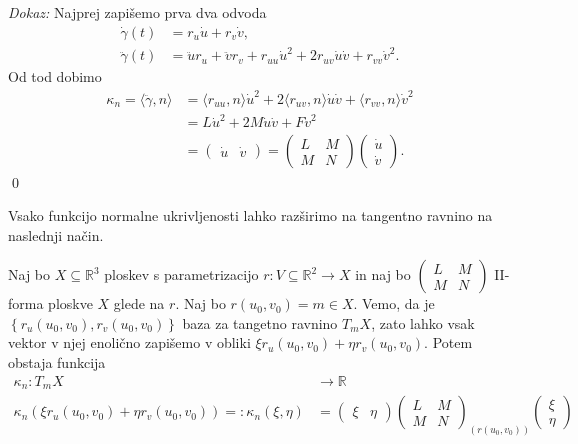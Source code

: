\noident
{\em Dokaz:\/}
 Najprej zapišemo prva dva odvoda 
 \begin{align*}
     \dot{\gamma}(t) &= r_u \dot{u} + r_v \dot{v}, \\
     \ddot{\gamma}(t) &= \ddot{u} r_u + \ddot{v} r_v + r_{uu} \dot{u}^2 + 2r_{uv} \dot{u} \dot{v} + r_{vv} \dot{v}^2   .
 \end{align*}
Od tod dobimo 
\begin{align*}
    \kappa_n = \langle \ddot{\gamma}, n \rangle  &= \langle r_{uu}, n \rangle \dot{u}^2 + 2  \langle r_{uv}, n \rangle \dot{u} \dot{v} + \langle r_{vv}, n \rangle  \dot{v}^2 \\
     &= L \dot{u}^2 + 2M \dot{u} \dot{v} + F \dot{v}^2 \\
     &= \begin{pmatrix}
        \dot{u} & \dot{v} 
      \end{pmatrix} = 
      \begin{pmatrix}
        L & M \\
        M & N
      \end{pmatrix}  
      \begin{pmatrix}
        \dot{u} \\
        \dot{v} 
      \end{pmatrix}.
\end{align*}
\qed

Vsako funkcijo normalne ukrivljenosti lahko razširimo na tangentno ravnino na naslednji način.

\begin{definicija}
\label{def_razsiritev_normalne_ukrivljenosti}
    Naj bo $X \subseteq \mathbb{R}^3$ ploskev s parametrizacijo $r: V \subseteq \mathbb{R}^2 \to  X$
    in naj bo $\begin{pmatrix}
    L & M \\
    M & N
    \end{pmatrix}$ II-forma ploskve $X$ glede na $r$. Naj bo $r(u_0, v_0) = m \in  X$. Vemo, da je $\left\{ r_u(u_0, v_0), r_v(u_0, v_0) \right\}$ baza za
    tangetno ravnino $T_mX$, zato lahko vsak vektor v njej enolično zapišemo v obliki $\xi r_u(u_0, v_0) + \eta r_v(u_0, v_0).$
    Potem obstaja funkcija \begin{align*}
       \kappa_n : T_mX &\longrightarrow \mathbb{R} \\
        \kappa_n(\xi r_u(u_0, v_0) + \eta r_v(u_0, v_0)) =: \kappa_n(\xi, \eta) &=
        \begin{pmatrix}
          \xi  & \eta
        \end{pmatrix}
        \begin{pmatrix}
          L & M \\
          M & N
        \end{pmatrix}_{(r(u_0, v_0))}  
        \begin{pmatrix}
          \xi \\
          \eta
        \end{pmatrix}
    \end{align*} 
\end{definicija}

